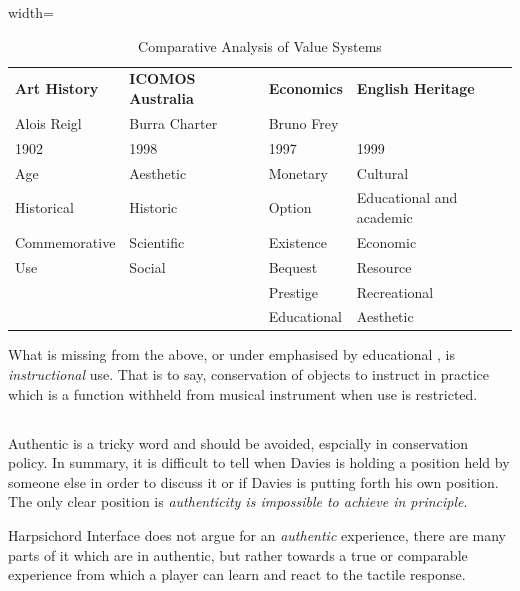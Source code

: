 \begin{table}[h]
    \centering
    \begin{adjustbox}{width=\textwidth}
        \begin{tabular}{llll}
            \toprule
            \textbf{Art History} & \textbf{ICOMOS Australia} &
            \textbf{Economics} & \textbf{English Heritage} \\
            Alois Reigl & Burra Charter & Bruno Frey &  \\ 
            1902 & 1998 & 1997 & 1999 \\ \hline
            Age& Aesthetic& Monetary & Cultural\\ 
             Historical &  Historic&  Option &  Educational and academic \\ 
             Commemorative& Scientific& Existence & Economic\\ 
             Use&  Social &  Bequest &  Resource \\ 
             & & Prestige & Recreational \\
             & & Educational & Aesthetic\\
        \end{tabular}
    \end{adjustbox}
    \caption{Comparative Analysis of Value Systems}
    \label{tab:values_comparison}
\end{table}

What is missing from the above, or under emphasised by educational , is
\textit{instructional} use. That is to say, conservation of objects to instruct
in practice which is a function withheld from musical instrument when use is
restricted.

\subsection{\cite[p. 206–253]{davies_authenticity_2001} }

Authentic is a tricky word and should be avoided, espcially in conservation
policy. In summary, it is difficult to tell when Davies is holding a position
held by someone else in order to discuss it or if Davies is putting forth his
own position. The only clear position is \textit{authenticity is impossible to
achieve in principle}.

Harpsichord Interface does not argue for an \textit{authentic} experience, there
are many parts of it which are in authentic, but rather towards a true or
comparable experience from which a player can learn and react to the tactile
response.

